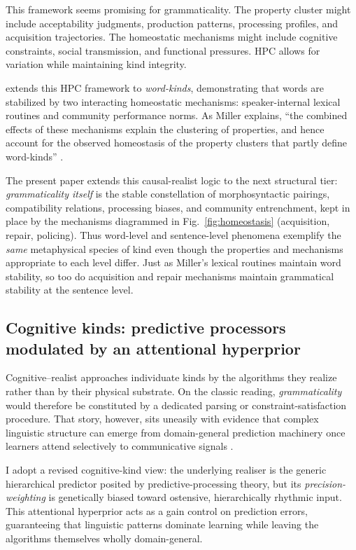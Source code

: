 \documentclass[12pt]{article}
\begin{document}
This framework seems promising for grammaticality. The property cluster might include acceptability judgments, production patterns, processing profiles, and acquisition trajectories. The homeostatic mechanisms might include cognitive constraints, social transmission, and functional pressures. HPC allows for variation while maintaining kind integrity.

\textcite{Miller2021} extends this HPC framework to \emph{word-kinds}, demonstrating that words are stabilized by two interacting homeostatic mechanisms: speaker-internal lexical routines and community performance norms. As Miller explains, \enquote{the combined effects of these mechanisms explain the clustering of properties, and hence account for the observed homeostasis of the property clusters that partly define word-kinds} \parencite[p.~26]{Miller2021}. 

The present paper extends this causal-realist logic to the next structural tier: \emph{grammaticality itself} is the stable constellation of morphosyntactic pairings, compatibility relations, processing biases, and community entrenchment, kept in place by the mechanisms diagrammed in Fig.~\ref{fig:homeostasis} (acquisition, repair, policing). Thus word-level and sentence-level phenomena exemplify the \emph{same} metaphysical species of kind even though the properties and mechanisms appropriate to each level differ. Just as Miller's lexical routines maintain word stability, so too do acquisition and repair mechanisms maintain grammatical stability at the sentence level.

\subsection{Cognitive kinds: predictive processors modulated by an attentional hyperprior}

Cognitive–realist approaches individuate kinds by the algorithms they realize rather than by their physical substrate.  On the classic reading, \emph{grammaticality} would therefore be constituted by a dedicated parsing or constraint-satisfaction procedure.  That story, however, sits uneasily with evidence that complex linguistic structure can emerge from domain-general prediction machinery once learners attend selectively to communicative signals \parencite{ReynoldsEcho}.

I adopt a revised cognitive-kind view: the underlying realiser is the generic hierarchical predictor posited by predictive-processing theory, but its \emph{precision-weighting} is genetically biased toward ostensive, hierarchically rhythmic input.  This attentional hyperprior acts as a gain control on prediction errors, guaranteeing that linguistic patterns dominate learning while leaving the algorithms themselves wholly domain-general.%
\end{document}
